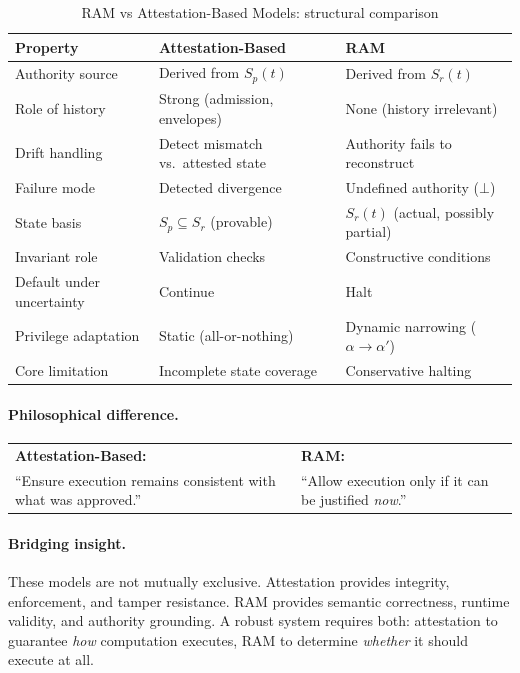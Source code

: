 \documentclass[11pt]{article}
\newcommand{\Sr}{S_r}
\newcommand{\Sp}{S_p}
\newcommand{\Ndefval}{\bot}
\begin{document}
\begin{table}[H]
\centering
\caption{RAM vs Attestation-Based Models: structural comparison}
\label{tab:comparison}
\begin{tabular}{lll}
\toprule
\textbf{Property} & \textbf{Attestation-Based} & \textbf{RAM} \\
\midrule
Authority source      & Derived from $\Sp(t)$              & Derived from $\Sr(t)$ \\
Role of history       & Strong (admission, envelopes)       & None (history irrelevant) \\
Drift handling        & Detect mismatch vs.\ attested state & Authority fails to reconstruct \\
Failure mode          & Detected divergence                 & Undefined authority ($\Ndefval$) \\
State basis           & $\Sp \subseteq \Sr$ (provable) & $\Sr(t)$ (actual, possibly partial) \\
Invariant role        & Validation checks                   & Constructive conditions \\
Default under uncertainty & Continue                       & Halt \\
Privilege adaptation  & Static (all-or-nothing)      & Dynamic narrowing ($\alpha \!\to\! \alpha'$) \\
Core limitation       & Incomplete state coverage           & Conservative halting \\
\bottomrule
\end{tabular}
\end{table}

\paragraph{Philosophical difference.}

\medskip
\begin{center}
\begin{tabular}{p{}p{}}
\textbf{Attestation-Based:} & \textbf{RAM:} \\
``Ensure execution remains consistent with what was approved.'' &
``Allow execution only if it can be justified \emph{now}.'' \\
\end{tabular}
\end{center}
\medskip

\paragraph{Bridging insight.}
These models are not mutually exclusive.
Attestation provides integrity, enforcement, and tamper resistance.
RAM provides semantic correctness, runtime validity, and authority grounding.
A robust system requires both: attestation to guarantee \emph{how} computation
executes, RAM to determine \emph{whether} it should execute at all.
\end{document}
